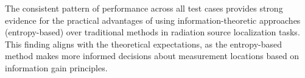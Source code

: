 \documentclass[../report.tex]{subfiles}
\begin{document}
    The consistent pattern of performance across all test cases provides strong evidence for the practical advantages of using information-theoretic approaches 
    (entropy-based) over traditional methods in radiation source localization tasks. This finding aligns with the theoretical expectations, as the entropy-based
    method makes more informed decisions about measurement locations based on information gain principles.
\end{document}
